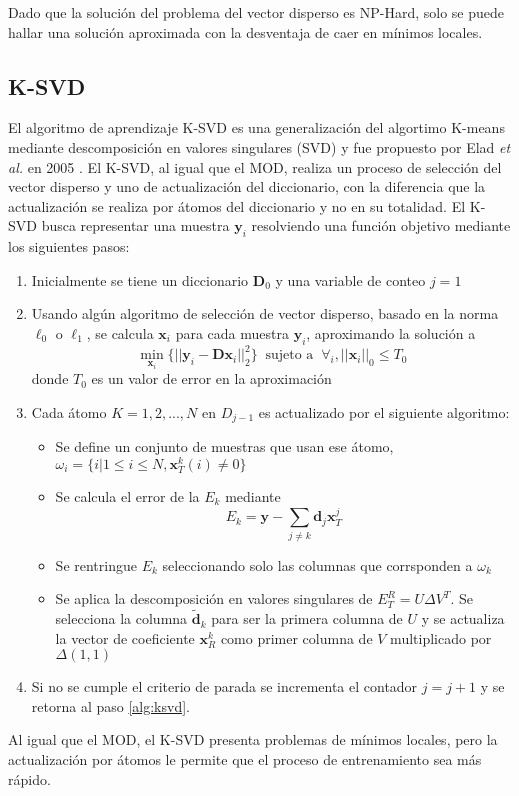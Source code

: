 Dado que la soluci\'on del problema del vector disperso es NP-Hard, solo se puede hallar una soluci\'on aproximada con la desventaja de caer en m\'inimos locales.  

\subsection{K-SVD}
El algoritmo de aprendizaje K-SVD es una generalizaci\'on del algortimo K-means mediante descomposici\'on en valores singulares (SVD) y fue propuesto por Elad \textit{et al.} en 2005 \cite{k-svd}. El K-SVD, al igual que el MOD, realiza un proceso de selecci\'on del vector disperso y uno de actualizaci\'on del diccionario, con la diferencia que la actualizaci\'on se realiza por \'atomos del diccionario y no en su totalidad. El K-SVD busca representar una muestra $\bm{y}_i$ resolviendo una funci\'on objetivo mediante los siguientes pasos:
\begin{enumerate}
\item Inicialmente se tiene un diccionario $\bm{D}_0$ y una variable de conteo $j=1$
\item \label{alg:ksvd} Usando alg\'un algoritmo de selecci\'on de vector disperso, basado en la norma $\ell_0$ o $\ell_1$, se calcula $\bm{x}_i$ para cada muestra $\bm{y}_i$, aproximando la soluci\'on a
\begin{equation}
\min_{\bm{x}_i}\{||\bm{y}_i-\bm{Dx}_i||_2^2\}\;\; \text{sujeto a} \;\; \forall_i, ||\bm{x}_i||_0 \leq T_0 
\end{equation}
donde $T_0$ es un valor de error en la aproximaci\'on
\item Cada \'atomo $K = 1,2,...,N$ en $D_{j-1}$ es actualizado por el siguiente algoritmo:
\begin{itemize}
\item Se define un conjunto de muestras que usan ese \'atomo, $ \omega_i = \{ i|1 \leq i \leq N, \bm{x}_T^k(i) \neq 0\}$
\item Se calcula el error de la $E_k$ mediante
\begin{equation}
E_k = \bm{y}-\sum \limits_{j\neq k} \bm{d}_j \bm{x}_T^j
\end{equation}
\item Se rentringue $E_k$ seleccionando solo las columnas que corrsponden a $\omega_k$
\item Se aplica la descomposici\'on en valores singulares de $E_T^R = U\Delta V^T$. Se selecciona la columna $\widetilde{\bm{d}}_k$ para ser la primera columna de $U$ y se actualiza la vector de coeficiente $\bm{x}_R^k$ como primer columna de $V$ multiplicado por $\Delta (1,1)$
\end{itemize}
\item Si no se cumple el criterio de parada se incrementa el contador $j = j+1$ y se retorna al paso \ref{alg:ksvd}. 
\end{enumerate}
Al igual que el MOD, el K-SVD presenta problemas de m\'inimos locales, pero la actualizaci\'on por \'atomos le permite que el proceso de entrenamiento sea m\'as r\'apido.

